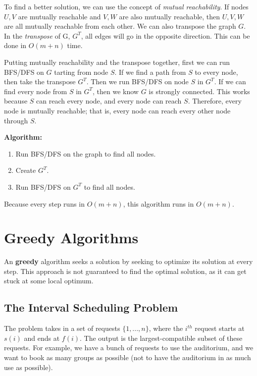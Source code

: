 \documentclass[11pt]{article}
\begin{document}
To find a better solution, we can use the concept of \textit{mutual reachability}. If nodes $U, V$ are mutually reachable and $V, W$ are also mutually reachable, then $U,V,W$ are all mutually reachable from each other. We can also transpose the graph $G$. In the \textit{transpose} of G, $G^T$, all edges will go in the opposite direction. This can be done in $O(m+n)$ time.

Putting mutually reachability and the transpose together, first we can run BFS/DFS on $G$ tarting from node $S$. If we find a path from $S$ to every node, then take the transpose $G^T$. Then we run BFS/DFS on node $S$ in $G^T$. If we can find every node from $S$ in $G^T$, then we know $G$ is strongly connected. This works because $S$ can reach every node, and every node can reach $S$. Therefore, every node is mutually reachable; that is, every node can reach every other node through $S$.

\vspace{12pt}
\noindent\textbf{Algorithm:}
\begin{enumerate}
    \item Run BFS/DFS on the graph to find all nodes.
    \item Create $G^T$.
    \item Run BFS/DFS on $G^T$ to find all nodes.
\end{enumerate}
Because every step runs in $O(m+n)$, this algorithm runs in $O(m+n)$.

\section{Greedy Algorithms}
\begin{tcolorbox}
An \textbf{greedy} algorithm seeks a solution by seeking to optimize its solution at every step. This approach is not guaranteed to find the optimal solution, as it can get stuck at some local optimum.
\end{tcolorbox}
\subsection{The Interval Scheduling Problem}
The problem takes in a set of requests $\{1, ..., n \}$, where the $i^{th}$ request starts at $s(i)$ and ends at $f(i)$. The output is the largest-compatible subset of these requests. For example, we have a bunch of requests to use the auditorium, and we want to book as many groups as possible (not to have the auditorium in as much use as possible). 
\end{document}
